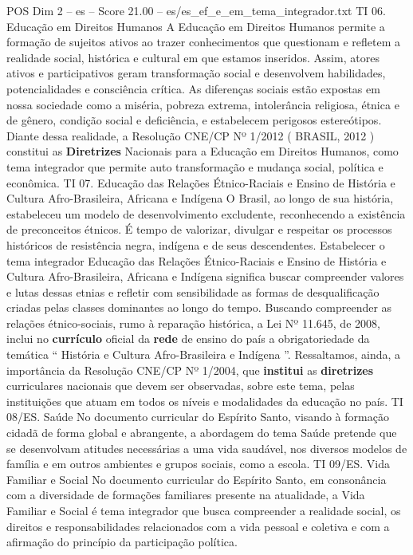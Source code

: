 \begin{textsample}{POS Dim 2 – es – Score 21.00 – es/es\_ef\_e\_em\_tema\_integrador.txt}
TI 06.
Educação em Direitos Humanos A Educação em Direitos Humanos permite a formação de sujeitos ativos ao trazer conhecimentos que questionam e refletem a realidade social, histórica e cultural em que estamos inseridos.
Assim, atores ativos e participativos geram transformação social e desenvolvem habilidades, potencialidades e consciência crítica.
As diferenças sociais estão expostas em nossa sociedade como a miséria, pobreza extrema, intolerância religiosa, étnica e de gênero, condição social e deficiência, e estabelecem perigosos estereótipos.
Diante dessa realidade, a Resolução CNE/CP Nº 1/2012 ( BRASIL, 2012 ) constitui as \textbf{Diretrizes} Nacionais para a Educação em Direitos Humanos, como tema integrador que permite auto transformação e mudança social, política e econômica.
TI 07.
Educação das Relações Étnico-Raciais e Ensino de História e Cultura Afro-Brasileira, Africana e Indígena O Brasil, ao longo de sua história, estabeleceu um modelo de desenvolvimento excludente, reconhecendo a existência de preconceitos étnicos.
É tempo de valorizar, divulgar e respeitar os processos históricos de resistência negra, indígena e de seus descendentes.
Estabelecer o tema integrador Educação das Relações Étnico-Raciais e Ensino de História e Cultura Afro-Brasileira, Africana e Indígena significa buscar compreender valores e lutas dessas etnias e refletir com sensibilidade as formas de desqualificação criadas pelas classes dominantes ao longo do tempo.
Buscando compreender as relações étnico-sociais, rumo à reparação histórica, a Lei Nº 11.645, de 2008, inclui no \textbf{currículo} oficial da \textbf{rede} de ensino do país a obrigatoriedade da temática “ História e Cultura Afro-Brasileira e Indígena ”.
Ressaltamos, ainda, a importância da Resolução CNE/CP Nº 1/2004, que \textbf{institui} as \textbf{diretrizes} curriculares nacionais que devem ser observadas, sobre este tema, pelas instituições que atuam em todos os níveis e modalidades da educação no país.
TI 08/ES.
Saúde No documento curricular do Espírito Santo, visando à formação cidadã de forma global e abrangente, a abordagem do tema Saúde pretende que se desenvolvam atitudes necessárias a uma vida saudável, nos diversos modelos de família e em outros ambientes e grupos sociais, como a escola.
TI 09/ES.
Vida Familiar e Social No documento curricular do Espírito Santo, em consonância com a diversidade de formações familiares presente na atualidade, a Vida Familiar e Social é tema integrador que busca compreender a realidade social, os direitos e responsabilidades relacionados com a vida pessoal e coletiva e com a afirmação do princípio da participação política.

\end{textsample}
